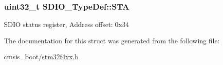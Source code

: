 \subsubsection[{\texorpdfstring{S\+TA}{STA}}]{ uint32\+\_\+t S\+D\+I\+O\+\_\+\+Type\+Def\+::\+S\+TA}\hypertarget{struct_s_d_i_o___type_def_a6b917b09c127e77bd3128bbe19a00499}{}\label{struct_s_d_i_o___type_def_a6b917b09c127e77bd3128bbe19a00499}
S\+D\+IO status register, Address offset\+: 0x34 

The documentation for this struct was generated from the following file\+:\begin{DoxyCompactItemize}
\item 
cmsis\+\_\+boot/\hyperlink{stm32f4xx_8h}{stm32f4xx.\+h}\end{DoxyCompactItemize}
